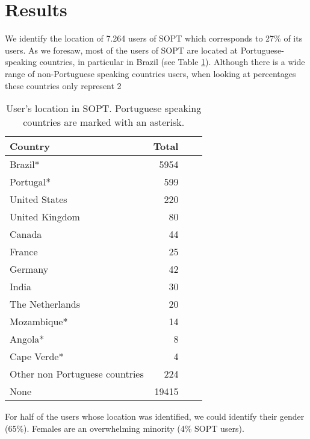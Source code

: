 \section{Results}
We identify the location of 7.264 users of SOPT which corresponds to 27\% of its users. As we foresaw, most of the users of SOPT are located at Portuguese-speaking countries, in particular in Brazil (see Table \ref{tbl:Locations}). Although there is a wide range of non-Portuguese speaking countries users, when looking at percentages these countries only represent 2%

\begin{table}[ht]
\begin{center}
\scriptsize{
\begin{tabular}{lrrr}
Country & Total \\
\hline
Brazil* 			& 5954 \\
Portugal* 			& 599 \\
United States 		& 220 \\
United Kingdom      & 80 \\
Canada				& 44 \\
France              & 25 \\
Germany				& 42 \\
India				& 30 \\
The Netherlands		& 20 \\
Mozambique*		    & 14 \\
Angola*		 		& 8 \\
Cape Verde*		    & 4 \\
Other non Portuguese countries		 & 224 \\
None 				& 19415 \\
\end{tabular}
\caption{User's location in SOPT. Portuguese speaking countries are marked with an asterisk.}
\label{tbl:Locations}
}
\end{center}
\end{table}

For half of the users whose location was identified, we could identify their gender (65\%). Females are an overwhelming minority (4\% SOPT users).




